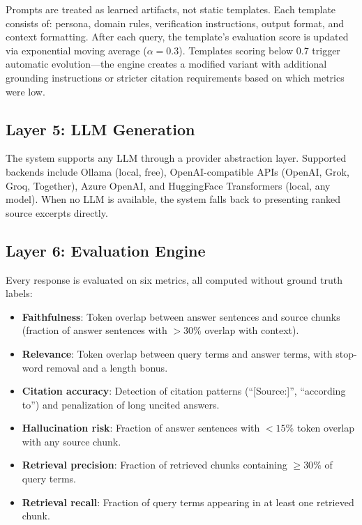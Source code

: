 \documentclass[11pt]{article}
\begin{document}
Prompts are treated as learned artifacts, not static templates. Each template consists of: persona, domain rules, verification instructions, output format, and context formatting. After each query, the template's evaluation score is updated via exponential moving average ($\alpha=0.3$). Templates scoring below 0.7 trigger automatic evolution---the engine creates a modified variant with additional grounding instructions or stricter citation requirements based on which metrics were low.

\subsection{Layer 5: LLM Generation}

The system supports any LLM through a provider abstraction layer. Supported backends include Ollama (local, free), OpenAI-compatible APIs (OpenAI, Grok, Groq, Together), Azure OpenAI, and HuggingFace Transformers (local, any model). When no LLM is available, the system falls back to presenting ranked source excerpts directly.

\subsection{Layer 6: Evaluation Engine}
\label{sec:eval}

Every response is evaluated on six metrics, all computed without ground truth labels:

\begin{itemize}
    \item \textbf{Faithfulness}: Token overlap between answer sentences and source chunks (fraction of answer sentences with $>30\%$ overlap with context).
    \item \textbf{Relevance}: Token overlap between query terms and answer terms, with stop-word removal and a length bonus.
    \item \textbf{Citation accuracy}: Detection of citation patterns (``[Source:]'', ``according to'') and penalization of long uncited answers.
    \item \textbf{Hallucination risk}: Fraction of answer sentences with $<15\%$ token overlap with any source chunk.
    \item \textbf{Retrieval precision}: Fraction of retrieved chunks containing $\geq 30\%$ of query terms.
    \item \textbf{Retrieval recall}: Fraction of query terms appearing in at least one retrieved chunk.
\end{itemize}
\end{document}
